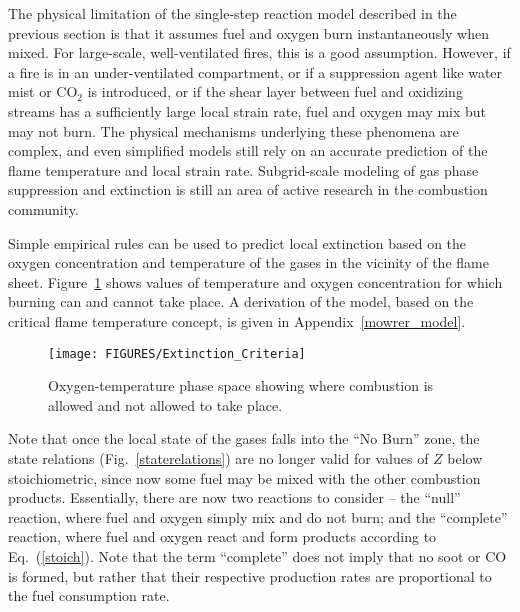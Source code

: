 \documentclass[11pt]{book}
\begin{document}
\label{extinction}

The physical limitation of the single-step reaction model described in the previous section is that it assumes fuel and
oxygen burn instantaneously when mixed. For large-scale, well-ventilated
fires, this is a good assumption. However, if a fire is in an
under-ventilated compartment, or if a suppression agent like water
mist or CO$_2$ is introduced, or if the shear layer between fuel and oxidizing streams
has a sufficiently large local strain rate,
fuel and oxygen may mix but may not burn.
The physical mechanisms underlying these phenomena are complex, and
even simplified models still rely on an accurate prediction
of the flame temperature and local strain rate.
Subgrid-scale modeling of gas phase suppression and
extinction is still an area of active research in the combustion
community.

Simple empirical rules can be used to predict local
extinction based on the oxygen concentration and temperature of
the gases in the vicinity of the flame sheet.
Figure~\ref{plotsupp} shows values of temperature and oxygen
concentration for which burning can and cannot take place. A derivation of the model,
based on the critical flame temperature concept, is given in Appendix~\ref{mowrer_model}.
\begin{figure}[ht]
\begin{minipage}[t]{4.1in}
\texttt{[image: FIGURES/Extinction\_Criteria]}
\caption{Oxygen-temperature phase space showing where combustion
is allowed and not allowed to take place.}
\label{plotsupp}
\end{minipage}
\end{figure}
Note that once the local state of the gases falls into the ``No Burn'' zone,
the state relations (Fig.~\ref{staterelations}) are no longer valid for
values of $Z$ below stoichiometric, since now some fuel may be mixed
with the other combustion products. Essentially, there
are now two reactions to consider -- the ``null'' reaction, where fuel and oxygen simply mix and do not burn;
and the ``complete'' reaction,
where fuel and oxygen react and form products according to Eq.~(\ref{stoich}). Note that the term ``complete'' does not imply that
no soot or CO is formed, but rather that their respective production rates are proportional to the fuel consumption rate.
\end{document}
